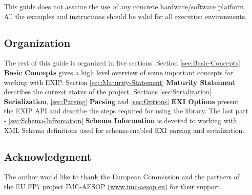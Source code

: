 This guide does not assume the use of any concrete hardware/software platform. All the examples and instructions
should be valid for all execution environments.

\subsection{Organization}
\label{sec:organization}

The rest of this guide is organized in five sections. Section \ref{sec:Basic-Concepts} \textbf{Basic Concepts}
gives a high level overview of some important concepts for working with EXIP. Section \ref{sec:Maturity-Statement} \textbf{Maturity Statement}
describes the current status of the project. Sections \ref{sec:Serialization} \textbf{Serialization}, 
\ref{sec:Parsing} \textbf{Parsing} and \ref{sec:Options} \textbf{EXI Options} present the EXIP API and describe the steps required for using the library.
The last part - \ref{sec:Schema-Infromation} \textbf{Schema Information} is devoted to working with XML Schema
definitions used for schema-enabled EXI parsing and serialization.

\subsection{Acknowledgment}
\label{sec:acknowledgment}
The author would like to thank the European Commission
and the partners of the EU FP7 project IMC-AESOP \href{http://www.imc-aesop.eu}{(www.imc-aesop.eu)}
for their support.